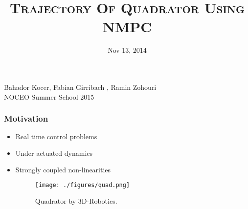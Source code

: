 \documentclass[13pt	]{beamer}
\title{\large\textsc{Trajectory Of Quadrator Using NMPC}}
\date{Nov 13, 2014}
\begin{document}
\begin{frame}
\titlepage
\begin{center}

\textsf{\footnotesize Bahador Kocer, Fabian Girribach , Ramin Zohouri}\\
\textsf{\footnotesize NOCEO Summer School 2015}\\

\end{center}
\end{frame} 


\begin{frame}
\frametitle{Motivation}
\begin{itemize}
\item Real time control problems
\item Under actuated dynamics
\item Strongly coupled non-linearities
\begin{figure}
\texttt{[image: ./figures/quad.png]}
\caption{\tiny Quadrator by 3D-Robotics.}
\end{figure}
\end{itemize}


\end{frame}
\end{document}
